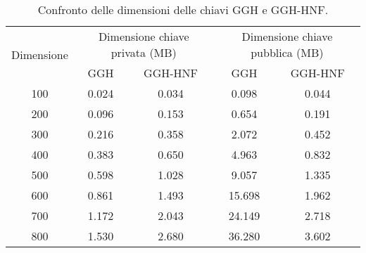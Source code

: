 \begin{table}[htbp]
    \centering
    \begin{tabular}{|c|c|c|c|c|}
        \hline
        \multirow{2}{*}{Dimensione} & 
        \multicolumn{2}{c|}{Dimensione chiave privata (MB)} & 
        \multicolumn{2}{c|}{Dimensione chiave pubblica (MB)} \\
        \cline{2-5}
        & GGH & GGH-HNF & GGH & GGH-HNF \\
        \hline
        100 & 0.024 & 0.034 & 0.098 & 0.044 \\
        200 & 0.096 & 0.153 & 0.654 & 0.191 \\
        300 & 0.216 & 0.358 & 2.072 & 0.452 \\
        400 & 0.383 & 0.650 & 4.963 & 0.832 \\
        500 & 0.598 & 1.028 & 9.057 & 1.335 \\
        600 & 0.861 & 1.493 & 15.698 & 1.962 \\
        700 & 1.172 & 2.043 & 24.149 & 2.718 \\
        800 & 1.530 & 2.680 & 36.280 & 3.602 \\
        \hline
    \end{tabular}
    \caption{Confronto delle dimensioni delle chiavi GGH e GGH-HNF.}
    \label{tab:key_size_comparison}
\end{table}